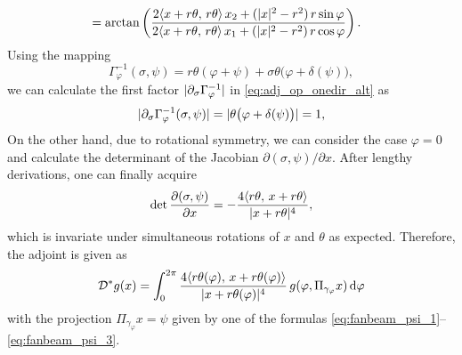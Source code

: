 \documentclass{amsart}
\renewcommand*{\phi}{\varphi}
\begin{document}
\begin{example}
\begin{align}
  \label{eq:fanbeam_psi_3}
  &= \arctan\left(\frac{2 \INNER{x + r\theta}{r\theta}\, x_2 + (\ABS{x}^2 - r^2)\, r\sin\phi}{
  2 \INNER{x + r\theta}{r\theta}\, x_1 + (\ABS{x}^2 - r^2)\, r\cos\phi} \right).
 \end{align}
 Using the mapping
 \begin{equation*}
  \Gamma_\phi^{-1}(\sigma,\psi) = r \theta(\phi + \psi) + \sigma \theta\big(\phi + \delta(\psi)\big),
 \end{equation*}
 we can calculate the first factor $\ABS{\partial_\sigma\Gamma_\phi^{-1}}$ in \eqref{eq:adj_op_onedir_alt} as
 \begin{equation*}
  \ABS{\partial_\sigma \Gamma_\phi^{-1}(\sigma,\psi)} = \ABS{\theta\big(\phi + \delta(\psi)\big)} = 1,
 \end{equation*}
 On the other hand, due to rotational symmetry, we can consider the case $\phi=0$ and calculate the determinant of the Jacobian 
 $\partial(\sigma,\psi)/\partial x$. After lengthy derivations, one can finally acquire
 \begin{equation*}
  \operatorname*{det} \frac{\partial(\sigma,\psi)}{\partial x} = - \frac{4 \langle r\theta,\,x+r\theta\rangle}{|x+r\theta|^4},
 \end{equation*}
 which is invariate under simultaneous rotations of $x$ and $\theta$ as expected. Therefore, the adjoint is given as
 \begin{equation}
  \OPD^* g(x) = \int_0^{2\pi} \frac{4 \INNER{r\theta(\phi)}{x+r\theta(\phi)}}{\ABS{x+r\theta(\phi)}^4}\, g(\phi, \Pi_{\gamma_\phi}x) \, \D 
\phi
 \end{equation} 
 with the projection $\Pi_{\gamma_\phi}x = \psi$ given by one of the formulas \eqref{eq:fanbeam_psi_1}--\eqref{eq:fanbeam_psi_3}.

\end{example}
\end{document}
